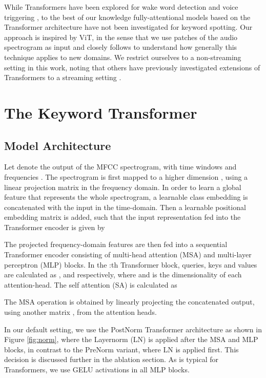 \documentclass[a4paper]{article}
\begin{document}
While Transformers have been explored for wake word detection \cite{wang2021wake} and voice triggering \cite{adya2020hybrid}, to the best of our knowledge fully-attentional models based on the Transformer architecture have not been investigated for keyword spotting. Our approach is inspired by ViT, in the sense that we use patches of the audio spectrogram as input and closely follows \cite{touvron2020training} to understand how generally this technique applies to new domains. We restrict ourselves to a non-streaming setting in this work, noting that others have previously investigated extensions of Transformers to a streaming setting \cite{wang2021wake, chenwu2020streaming}.

\section{The Keyword Transformer}

\subsection{Model Architecture}

Let  denote the output of the MFCC spectrogram, with time windows  and frequencies . The spectrogram is first mapped to a higher dimension , using a linear projection matrix  in the frequency domain. In order to learn a global feature that represents the whole spectrogram, a learnable class embedding  is concatenated with the input in the time-domain. Then a learnable positional embedding matrix  is added, such that the input representation fed into the Transformer encoder is given by

The projected frequency-domain features are then fed into a sequential Transformer encoder consisting of  multi-head attention (MSA) and multi-layer perceptron (MLP) blocks. In the :th Transformer block, queries, keys and values are calculated as ,  and  respectively, where  and  is the dimensionality of each attention-head. The self attention (SA) is calculated as

The MSA operation is obtained by linearly projecting the concatenated output, using another matrix , from the  attention heads.

In our default setting, we use the PostNorm \cite{vaswani2017attention} Transformer architecture as shown in Figure \ref{fig:norm}, where the Layernorm (LN) \cite{ba2016layer} is applied after the MSA and MLP blocks, in contrast to the PreNorm \cite{he2016deep} variant, where LN is applied first. This decision is discussed further in the ablation section. As is typical for Transformers, we use GELU \cite{hendrycks2016gaussian} activations in all MLP blocks.
\end{document}
